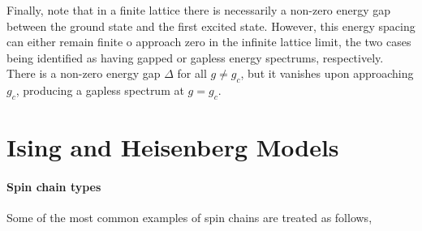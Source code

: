 \documentclass{homework}
\begin{document}
Finally, note that in a finite lattice there is necessarily a non-zero energy gap between the ground state and the first excited state. However, this energy spacing can either remain finite o approach zero in the infinite lattice limit, the two cases being identified as having gapped or gapless energy spectrums, respectively. There is a non-zero energy gap $\Delta$ for all $g \neq g_c$, but it vanishes upon approaching $g_c$, producing a gapless spectrum at $g = g_c$. 

\clearpage

\section{Ising and Heisenberg Models}

\paragraph{\textbf{Spin chain types}}

Some of the most common examples of spin chains are treated as follows, 
\end{document}
